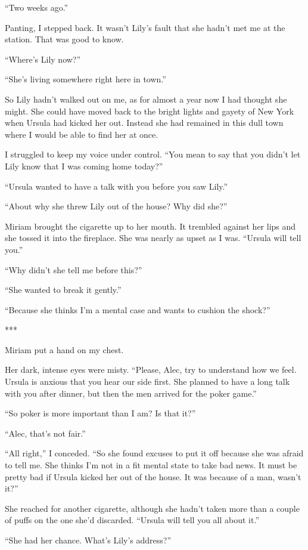 \documentclass{novel}
\begin{document}
{“Two weeks ago.”

Panting, I stepped back. It wasn’t Lily’s fault that she hadn’t met me at the station. That was good to know.

“Where’s Lily now?”

“She’s living somewhere right here in town.”

So Lily hadn’t walked out on me, as for almost a year now I had thought she might. She could have moved back to the bright lights and gayety of New York when Ursula had kicked her out. Instead she had remained in this dull town where I would be able to find her at once.

I struggled to keep my voice under control. “You mean to say that you didn’t let Lily know that I was coming home today?”

“Ursula wanted to have a talk with you before you saw Lily.”

“About why she threw Lily out of the house? Why did she?”

Miriam brought the cigarette up to her mouth. It trembled against her lips and she tossed it into the fireplace. She was nearly as upset as I was. “Ursula will tell you.”

“Why didn’t she tell me before this?”

“She wanted to break it gently.”

“Because she thinks I’m a mental case and wants to cushion the shock?”

***

Miriam put a hand on my chest.

Her dark, intense eyes were misty. “Please, Alec, try to understand how we feel. Ursula is anxious that you hear our side first. She planned to have a long talk with you after dinner, but then the men arrived for the poker game.”

“So poker is more important than I am? Is that it?”

“Alec, that’s not fair.”

“All right,” I conceded. “So she found excuses to put it off because she was afraid to tell me. She thinks I’m not in a fit mental state to take bad news. It must be pretty bad if Ursula kicked her out of the house. It was because of a man, wasn’t it?”

She reached for another cigarette, although she hadn’t taken more than a couple of puffs on the one she’d discarded. “Ursula will tell you all about it.”

“She had her chance. What’s Lily’s address?”

}
\end{document}
